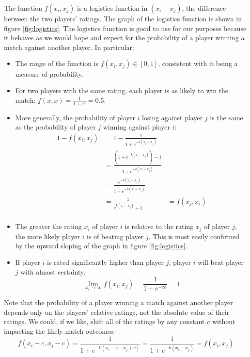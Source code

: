 \documentclass{article}
\begin{document}
The function $f(x_i, x_j)$ is a logistics function in $(x_i - x_j)$, the
difference between the two players' ratings. The graph of the logistics
function is shown in figure \ref{fig:logistics}. The logistics function is
good to use for our purposes because it behaves as we would hope and expect
for the probability of a player winning a match against another player. In
particular:
\begin{itemize}
  \item The range of the function is $f(x_i, x_j) \in [0, 1]$, consistent with
    it being a measure of probability.

  \item For two players with the same rating, each player is as likely to win
    the match: $f(x, x) = \frac{1}{1 + e^0} = 0.5$.

  \item More generally, the probability of player $i$ losing against player
    $j$ is the same as the probability of player $j$ winning against player
    $i$:
    \begin{align}
      1 - f(x_i, x_j) &= 1 - \frac{1}{1 + e^{-k(x_i - x_j)}} & \\
                      &= \frac{(1 + e^{-k(x_i - x_j)}) - 1}{1 + e^{-k(x_i - x_j)}} & \\
                      &= \frac{e^{-k(x_i - x_j)}}{1 + e^{-k(x_i - x_j)}} & \\
                      &= \frac{1}{e^{k(x_i - x_j)} + 1} &= f(x_j, x_i) \\
    \end{align}

  \item The greater the rating $x_i$ of player $i$ is relative to the rating
    $x_j$ of player $j$, the more likely player $i$ is of beating player $j$.
    This is most easily confirmed by the upward sloping of the graph in figure
    \ref{fig:logistics}.

  \item If player $i$ is rated significantly higher than player $j$, player
    $i$ will beat player $j$ with almost certainty.
    \begin{equation}
      \lim_{x_i \to \infty} f(x_i, x_j) = \frac{1}{1 + e^{-\infty}} = 1
    \end{equation}
\end{itemize}

Note that the probability of a player winning a match against another player
depends only on the players' relative ratings, not the absolute value of their
ratings. We could, if we like, shift all of the ratings by any constant $c$
without impacting the likely match outcomes:
\begin{equation}
  f(x_i - c, x_j - c) =
  \frac{1}{1 + e^{-k(x_i - c - x_j + c)}} =
  \frac{1}{1 + e^{-k(x_i - x_j)}} = f(x_i, x_j)
\end{equation}
\end{document}
